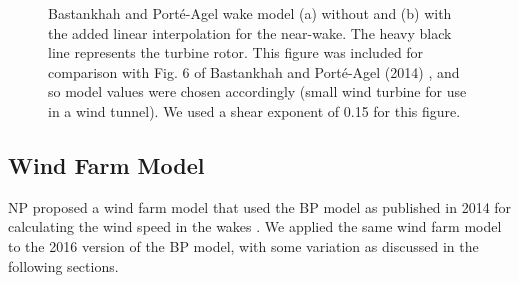 \documentclass[conf]{new-aiaa}
\begin{document}
\begin{figure}[htbp!]
	\centering
	\caption{Bastankhah and Port\'{e}-Agel wake model (a) without and (b) with the added linear interpolation for the near-wake. The heavy black line represents the turbine rotor. This figure was included for comparison with Fig. 6 of Bastankhah and Port\'{e}-Agel (2014) \cite{bastankhah2014}, and so model values were chosen accordingly (small wind turbine for use in a wind tunnel). We used a shear exponent of 0.15 for this figure.}
	
	\label{fig:model_contours}
\end{figure}

\subsection{Wind Farm Model}\label{sec:npa}
NP proposed a wind farm model that used the BP model as published in 2014 \cite{bastankhah2014} for calculating the wind speed in the wakes \cite{niayifar2015, niayifar2016}. We applied the same wind farm model to the 2016 version of the BP model, with some variation as discussed in the following sections.
\end{document}
